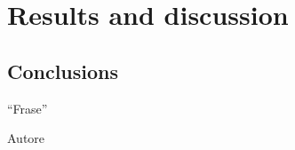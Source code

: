 \documentclass[12pt,a4paper]{report}
\begin{document}
\part{Results and discussion}

\chapter{Conclusions}\epigraph{``Frase''}{Autore}
\end{document}
